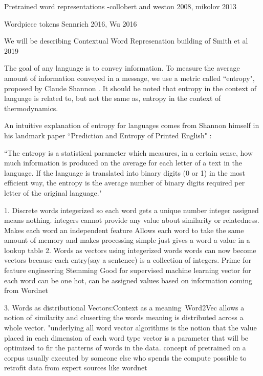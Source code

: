 \documentclass [11pt, proquest] {uwthesis}[2020/08/20]
\begin{document}
Pretrained word representations
-collobert and weston 2008, mikolov 2013

Wordpiece tokens Sennrich 2016, Wu 2016

We will be describing Contextual Word Represenation building of Smith et al 2019 \cite{Smith2019ContextualWR} 



The goal of any language is to convey information. To measure the average amount of information conveyed in a message, we use a metric called “entropy", proposed by Claude Shannon . It should be noted that entropy in the context of language is related to, but not the same as, entropy in the context of thermodynamics.


An intuitive explanation of entropy for languages comes from Shannon himself in his landmark paper “Prediction and Entropy of Printed English" :

“The entropy is a statistical parameter which measures, in a certain sense, how much information is produced on the average for each letter of a text in the language. If the language is translated into binary digits (0 or 1) in the most efficient way, the entropy is the average number of binary digits required per letter of the original language."


1. Discrete words
    integerized so each word gets a unique number
    integer assigned means nothing. integers cannot provide any value about similarity or relatedness. Makes each word an independent feature
    Allows each word to take the same amount of memory and makes processing simple
    just gives a word a value in a lookup table
2. Words as vectors
    using integerized words words can now become vectors because each entry(say a sentence) is a collection of integers. 
    Prime for feature engineering
    Stemming 
    Good for supervised machine learning 
    vector for each word can be one hot, can be assigned values based on information coming from Wordnet

3. Words as distributional Vectors:Context as a meaning\
    Word2Vec
    allows a notion of similarity and cluserting
    the words meaning is distributed across a whole vector. 
    "underlying all word vector algorithms is the notion that the value placed in each dimension of each word type vector is a parameter that will be optimized to fir the patterns of words in the data. 
    concept of pretrained on a corpus usually executed by someone else who spends the compute
    possible to retrofit data from expert sources like wordnet 
\end{document}
